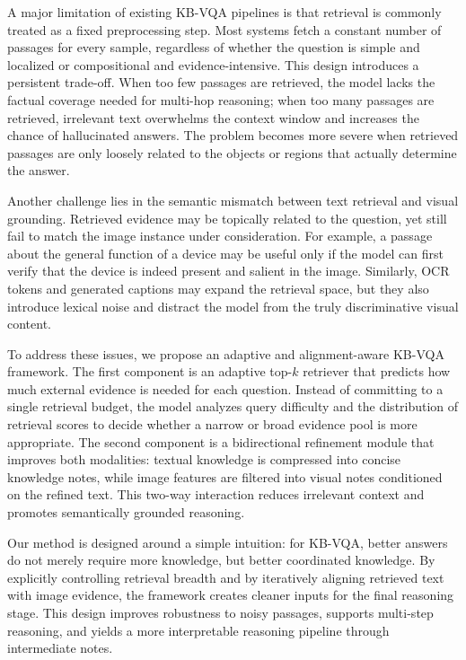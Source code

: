 \documentclass[manuscript,screen,review]{acmart}
\begin{document}
A major limitation of existing KB-VQA pipelines is that retrieval is commonly treated as a fixed preprocessing step. Most systems fetch a constant number of passages for every sample, regardless of whether the question is simple and localized or compositional and evidence-intensive. This design introduces a persistent trade-off. When too few passages are retrieved, the model lacks the factual coverage needed for multi-hop reasoning; when too many passages are retrieved, irrelevant text overwhelms the context window and increases the chance of hallucinated answers. The problem becomes more severe when retrieved passages are only loosely related to the objects or regions that actually determine the answer.

Another challenge lies in the semantic mismatch between text retrieval and visual grounding. Retrieved evidence may be topically related to the question, yet still fail to match the image instance under consideration. For example, a passage about the general function of a device may be useful only if the model can first verify that the device is indeed present and salient in the image. Similarly, OCR tokens and generated captions may expand the retrieval space, but they also introduce lexical noise and distract the model from the truly discriminative visual content.

To address these issues, we propose an adaptive and alignment-aware KB-VQA framework. The first component is an adaptive top-$k$ retriever that predicts how much external evidence is needed for each question. Instead of committing to a single retrieval budget, the model analyzes query difficulty and the distribution of retrieval scores to decide whether a narrow or broad evidence pool is more appropriate. The second component is a bidirectional refinement module that improves both modalities: textual knowledge is compressed into concise knowledge notes, while image features are filtered into visual notes conditioned on the refined text. This two-way interaction reduces irrelevant context and promotes semantically grounded reasoning.

Our method is designed around a simple intuition: for KB-VQA, better answers do not merely require more knowledge, but better coordinated knowledge. By explicitly controlling retrieval breadth and by iteratively aligning retrieved text with image evidence, the framework creates cleaner inputs for the final reasoning stage. This design improves robustness to noisy passages, supports multi-step reasoning, and yields a more interpretable reasoning pipeline through intermediate notes.
\end{document}
